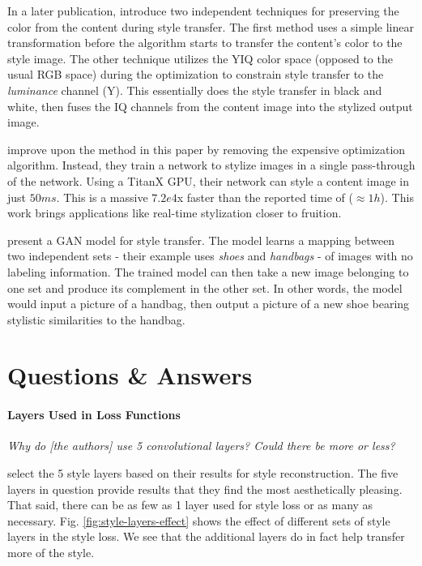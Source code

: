 \documentclass{article}
\begin{document}
In a later publication, \cite{preserving-color-in-neural-style-transfer}
introduce two independent techniques for preserving the color from the content
during style transfer. The first method uses a simple linear transformation
before the algorithm starts to transfer the content's color to the style
image. The other technique utilizes the YIQ color space (opposed to the usual
RGB space) during the optimization to constrain style transfer to the
\textit{luminance} channel (Y). This essentially does the style transfer in
black and white, then fuses the IQ channels from the content image into the
stylized output image.

\cite{2016arXiv160308155J} improve upon the method in this paper by removing
the expensive optimization algorithm. Instead, they train a network to stylize
images in a single pass-through of the network. Using a TitanX GPU, their
network can style a content image in just $50ms$. This is a massive $7.2e4$x
faster than the reported time of \cite{2015arXiv150806576G} ($\approx 1h$).
This work  brings applications like real-time stylization closer to fruition.

\cite{kim2017learning} present a \ac{GAN} model for style transfer. The model
learns a mapping between two independent sets - their example uses
\textit{shoes} and \textit{handbags} - of images with no labeling information.
The trained model can then take a new image belonging to one set and produce
its complement in the other set. In other words, the model would input a
picture of a handbag, then output a picture of a new shoe bearing stylistic
similarities to the handbag.




\section{Questions \& Answers}

\paragraph{Layers Used in Loss Functions} \textit{Why do [the authors] use 5
convolutional layers? Could there be more or less?}

\cite{2015arXiv150806576G} select the 5 style layers based on their results
for style reconstruction. The five layers in question provide results that
they find the most aesthetically pleasing. That said, there can be as few as
1 layer used for style loss or as many as necessary. Fig.
\ref{fig:style-layers-effect} shows the effect of different sets of style
layers in the style loss. We see that the additional layers do in fact help
transfer more of the style.
\end{document}
